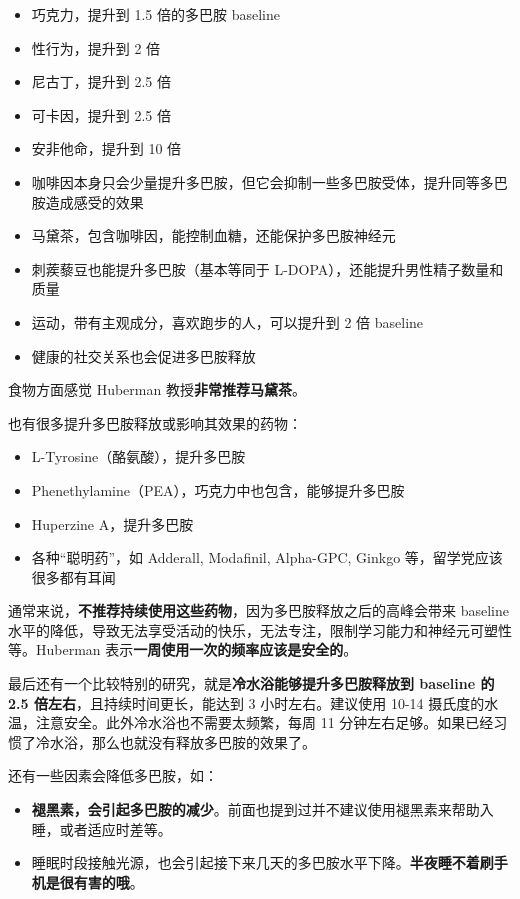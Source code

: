 \documentclass{report}
\begin{document}
\begin{itemize}
    \item 巧克力，提升到 1.5 倍的多巴胺 baseline
    \item 性行为，提升到 2 倍
    \item 尼古丁，提升到 2.5 倍
    \item 可卡因，提升到 2.5 倍
    \item 安非他命，提升到 10 倍
    \item 咖啡因本身只会少量提升多巴胺，但它会抑制一些多巴胺受体，提升同等多巴胺造成感受的效果
    \item 马黛茶，包含咖啡因，能控制血糖，还能保护多巴胺神经元
    \item 刺蒺藜豆也能提升多巴胺（基本等同于 L-DOPA），还能提升男性精子数量和质量
    \item 运动，带有主观成分，喜欢跑步的人，可以提升到 2 倍 baseline
    \item 健康的社交关系也会促进多巴胺释放
\end{itemize}

食物方面感觉 Huberman 教授\textbf{非常推荐马黛茶}。

也有很多提升多巴胺释放或影响其效果的药物：

\begin{itemize}
    \item L-Tyrosine（酪氨酸），提升多巴胺
    \item Phenethylamine（PEA），巧克力中也包含，能够提升多巴胺
    \item Huperzine A，提升多巴胺
    \item 各种“聪明药”，如 Adderall, Modafinil, Alpha-GPC, Ginkgo 等，留学党应该很多都有耳闻
\end{itemize}

通常来说，\textbf{不推荐持续使用这些药物}，因为多巴胺释放之后的高峰会带来 baseline 水平的降低，导致无法享受活动的快乐，无法专注，限制学习能力和神经元可塑性等。Huberman 表示\textbf{一周使用一次的频率应该是安全的}。

最后还有一个比较特别的研究，就是\textbf{冷水浴能够提升多巴胺释放到 baseline 的 2.5 倍左右}，且持续时间更长，能达到 3 小时左右。建议使用 10-14 摄氏度的水温，注意安全。此外冷水浴也不需要太频繁，每周 11 分钟左右足够。如果已经习惯了冷水浴，那么也就没有释放多巴胺的效果了。

还有一些因素会降低多巴胺，如：

\begin{itemize}
    \item \textbf{褪黑素，会引起多巴胺的减少}。前面也提到过并不建议使用褪黑素来帮助入睡，或者适应时差等。
    \item 睡眠时段接触光源，也会引起接下来几天的多巴胺水平下降。\textbf{半夜睡不着刷手机是很有害的哦}。
\end{itemize}
\end{document}
